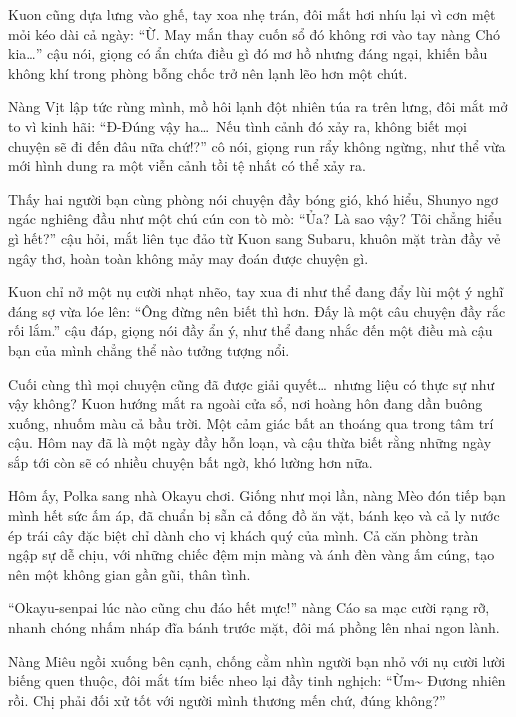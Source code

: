 \documentclass[../main.tex]{subfiles}
\begin{document}
Kuon cũng dựa lưng vào ghế, tay xoa nhẹ trán, đôi mắt hơi nhíu lại vì cơn mệt mỏi kéo dài cả ngày: ``Ừ. May mắn thay cuốn sổ đó không rơi vào tay nàng Chó kia\dots'' cậu nói, giọng có ẩn chứa điều gì đó mơ hồ nhưng đáng ngại, khiến bầu không khí trong phòng bỗng chốc trở nên lạnh lẽo hơn một chút.

Nàng Vịt lập tức rùng mình, mồ hôi lạnh đột nhiên túa ra trên lưng, đôi mắt mở to vì kinh hãi: ``Đ-Đúng vậy ha\dots\ Nếu tình cảnh đó xảy ra, không biết mọi chuyện sẽ đi đến đâu nữa chứ!?'' cô nói, giọng run rẩy không ngừng, như thể vừa mới hình dung ra một viễn cảnh tồi tệ nhất có thể xảy ra.

Thấy hai người bạn cùng phòng nói chuyện đầy bóng gió, khó hiểu, Shunyo ngơ ngác nghiêng đầu như một chú cún con tò mò: ``Ủa? Là sao vậy? Tôi chẳng hiểu gì hết?'' cậu hỏi, mắt liên tục đảo từ Kuon sang Subaru, khuôn mặt tràn đầy vẻ ngây thơ, hoàn toàn không mảy may đoán được chuyện gì.

Kuon chỉ nở một nụ cười nhạt nhẽo, tay xua đi như thể đang đẩy lùi một ý nghĩ đáng sợ vừa lóe lên: ``Ông đừng nên biết thì hơn. Đấy là một câu chuyện đầy rắc rối lắm.'' cậu đáp, giọng nói đầy ẩn ý, như thể đang nhắc đến một điều mà cậu bạn của mình chẳng thể nào tưởng tượng nổi.

Cuối cùng thì mọi chuyện cũng đã được giải quyết\dots\ nhưng liệu có thực sự như vậy không? Kuon hướng mắt ra ngoài cửa sổ, nơi hoàng hôn đang dần buông xuống, nhuốm màu cả bầu trời. Một cảm giác bất an thoáng qua trong tâm trí cậu. Hôm nay đã là một ngày đầy hỗn loạn, và cậu thừa biết rằng những ngày sắp tới còn sẽ có nhiều chuyện bất ngờ, khó lường hơn nữa.

\ct

Hôm ấy, Polka sang nhà Okayu chơi. Giống như mọi lần, nàng Mèo đón tiếp bạn mình hết sức ấm áp, đã chuẩn bị sẵn cả đống đồ ăn vặt, bánh kẹo và cả ly nước ép trái cây đặc biệt chỉ dành cho vị khách quý của mình. Cả căn phòng tràn ngập sự dễ chịu, với những chiếc đệm mịn màng và ánh đèn vàng ấm cúng, tạo nên một không gian gần gũi, thân tình.

``Okayu-senpai lúc nào cũng chu đáo hết mực!'' nàng Cáo sa mạc cười rạng rỡ, nhanh chóng nhấm nháp đĩa bánh trước mặt, đôi má phồng lên nhai ngon lành.

Nàng Miêu ngồi xuống bên cạnh, chống cằm nhìn người bạn nhỏ với nụ cười lười biếng quen thuộc, đôi mắt tím biếc nheo lại đầy tinh nghịch: ``Ừm\~{} Đương nhiên rồi. Chị phải đối xử tốt với người mình thương mến chứ, đúng không?''
\end{document}
